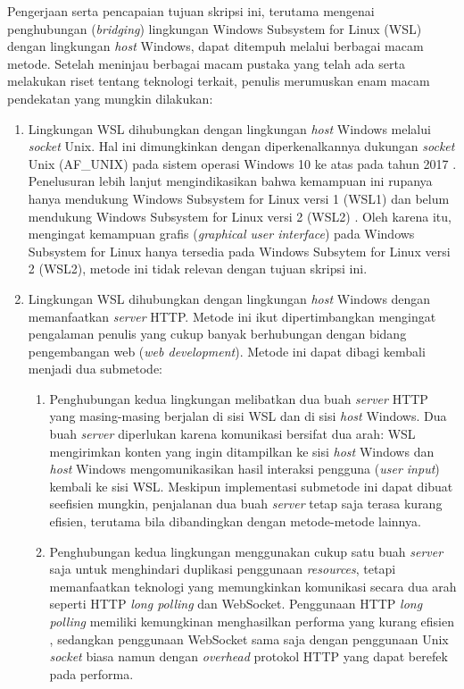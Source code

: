 Pengerjaan serta pencapaian tujuan skripsi ini, terutama mengenai penghubungan (\textit{bridging}) lingkungan Windows Subsystem for Linux (WSL) dengan lingkungan \textit{host} Windows, dapat ditempuh melalui berbagai macam metode. Setelah meninjau berbagai macam pustaka yang telah ada serta melakukan riset tentang teknologi terkait, penulis merumuskan enam macam pendekatan yang mungkin dilakukan:
\begin{enumerate}
    \item Lingkungan WSL dihubungkan dengan lingkungan \textit{host} Windows melalui \textit{socket} Unix. Hal ini dimungkinkan dengan diperkenalkannya dukungan \textit{socket} Unix (AF\_UNIX) pada sistem operasi Windows 10 ke atas pada tahun 2017 \cite{bringing-afunix-to-windows}. Penelusuran lebih lanjut mengindikasikan bahwa kemampuan ini rupanya hanya mendukung Windows Subsystem for Linux versi 1 (WSL1) dan belum mendukung Windows Subsystem for Linux versi 2 (WSL2) \cite{github-issues-afunix-not-supported-in-wsl2}. Oleh karena itu, mengingat kemampuan grafis (\textit{graphical user interface}) pada Windows Subsystem for Linux hanya tersedia pada Windows Subsytem for Linux versi 2 (WSL2), metode ini tidak relevan dengan tujuan skripsi ini.
    
    \item Lingkungan WSL dihubungkan dengan lingkungan \textit{host} Windows dengan memanfaatkan \textit{server} HTTP. Metode ini ikut dipertimbangkan mengingat pengalaman penulis yang cukup banyak berhubungan dengan bidang pengembangan web (\textit{web development}). Metode ini dapat dibagi kembali menjadi dua submetode:
    
    \begin{enumerate}
        \item Penghubungan kedua lingkungan melibatkan dua buah \textit{server} HTTP yang masing-masing berjalan di sisi WSL dan di sisi \textit{host} Windows. Dua buah \textit{server} diperlukan karena komunikasi bersifat dua arah: WSL mengirimkan konten yang ingin ditampilkan ke sisi \textit{host} Windows dan \textit{host} Windows mengomunikasikan hasil interaksi pengguna (\textit{user input}) kembali ke sisi WSL. Meskipun implementasi submetode ini dapat dibuat seefisien mungkin, penjalanan dua buah \textit{server} tetap saja terasa kurang efisien, terutama bila dibandingkan dengan metode-metode lainnya.
        
        \item Penghubungan kedua lingkungan menggunakan cukup satu buah \textit{server} saja untuk menghindari duplikasi penggunaan \textit{resources}, tetapi memanfaatkan teknologi yang memungkinkan komunikasi secara dua arah seperti HTTP \textit{long polling} dan WebSocket. Penggunaan HTTP \textit{long polling} memiliki kemungkinan menghasilkan performa yang kurang efisien \cite{problems-in-http-long-polling}, sedangkan penggunaan WebSocket sama saja dengan penggunaan Unix \textit{socket} biasa namun dengan \textit{overhead} protokol HTTP yang dapat berefek pada performa.
    \end{enumerate}
    

\end{enumerate}

